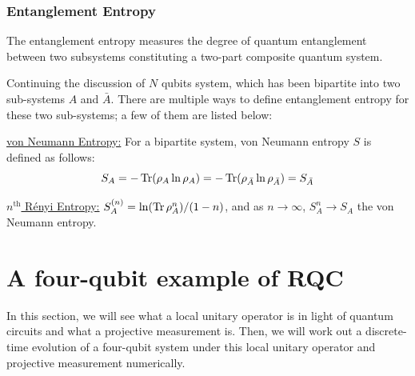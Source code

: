\documentclass[11pt, oneside, listof=totoc]{scrbook}
\begin{document}
\subsubsection{Entanglement Entropy}

\begin{definition}
    The entanglement entropy measures the degree of quantum entanglement between two subsystems constituting a two-part composite quantum system.
\end{definition}
Continuing the discussion of \(N\) qubits system, which has been bipartite into two sub-systems \(A\) and \(\bar{A}\).
There are multiple ways to define entanglement entropy for these two sub-systems; a few of them are listed below:
\begin{list}{}{}
    \item[\uline{von Neumann Entropy:}] For a bipartite system, von Neumann entropy \(S\) is defined as follows:
        \begin{equation}
            S_{A} = - \Tr(\rho_{A} \ln \rho_{A}) = - \Tr(\rho_{\bar{A}} \ln \rho_{\bar{A}}) = S_{\bar{A}}
        \end{equation}

    \item[\uline{\(n^\text{th}\) R\'enyi Entropy:}] \(S_{A}^{(n)} = \ln(\Tr \rho_{A}^n) / (1 - n)\), and as \(n \to \infty\), \(S_A^n \to S_A\) \ie the von Neumann entropy.
\end{list}


\section{A four-qubit example of RQC}

In this section, we will see what a local unitary operator is in light of quantum circuits and what a projective measurement is. Then, we will work out a discrete-time evolution of a four-qubit system under this local unitary operator and projective measurement numerically.
\end{document}
